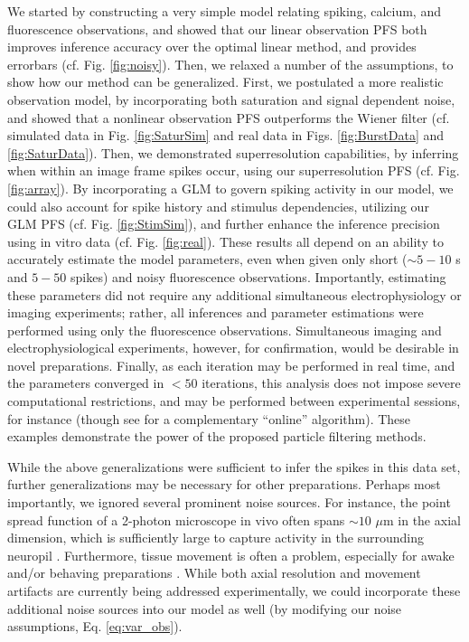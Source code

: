 \documentclass[10pt]{article}
\begin{document}
We started by constructing a very simple model relating spiking, calcium, and fluorescence observations, and showed that our linear observation PFS both improves inference accuracy over the optimal linear method, and provides errorbars (cf. Fig. \ref{fig:noisy}). Then, we relaxed a number of the assumptions, to show how our method can be generalized. First, we postulated a more realistic observation model, by incorporating both saturation and signal dependent noise, and showed that a nonlinear observation PFS outperforms the Wiener filter (cf. simulated data in Fig. \ref{fig:SaturSim} and real data in Figs. \ref{fig:BurstData} and \ref{fig:SaturData}). Then, we demonstrated superresolution capabilities, by inferring when within an image frame spikes occur, using our superresolution PFS (cf. Fig. \ref{fig:array}). By incorporating a GLM to govern spiking activity in our model, we could also account for spike history and stimulus dependencies, utilizing our GLM PFS (cf. Fig. \ref{fig:StimSim}), and further enhance the inference precision using in vitro data (cf. Fig. \ref{fig:real}). These results all depend on an ability to accurately estimate the model parameters, even when given only short ($\sim 5-10$ s and $5-50$ spikes) and noisy fluorescence observations.  Importantly, estimating these parameters did not require any additional simultaneous electrophysiology or imaging experiments; rather, all inferences and parameter estimations were performed using only the fluorescence observations.  Simultaneous imaging and electrophysiological experiments, however, for confirmation, would be desirable in novel preparations. Finally, as each iteration may be performed in real time, and the parameters converged in $<50$ iterations, this analysis does not impose severe computational restrictions, and may be performed between experimental sessions, for instance (though see \cite{VogelsteinPaninski09} for a complementary ``online'' algorithm). These examples demonstrate the power of the proposed particle filtering methods. 

While the above generalizations were sufficient to infer the spikes in this data set, further generalizations may be necessary for other preparations.  Perhaps most importantly, we ignored several prominent noise sources.  For instance, the point spread function of a 2-photon microscope in vivo often spans $\sim 10$ $\mu$m in the axial dimension, which is sufficiently large to capture activity in the surrounding neuropil \cite{GobelHelmchen07}. Furthermore, tissue movement is often a problem, especially for awake and/or behaving preparations \cite{DombeckTank07}. While both axial resolution and movement artifacts are currently being addressed experimentally, we could incorporate these additional noise sources into our model as well (by modifying our noise assumptions, Eq. \ref{eq:var_obs}).
\end{document}
